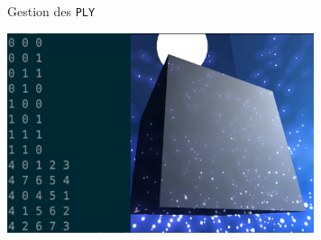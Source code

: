 \documentclass[10pt]{beamer}
\begin{document}
\begin{frame}[fragile]{Gestion des \texttt{PLY}}
	\begin{center}
		\includegraphics[width=9cm]{./imgs/cube-ply.png}
	\end{center}
\end{frame}
\end{document}
